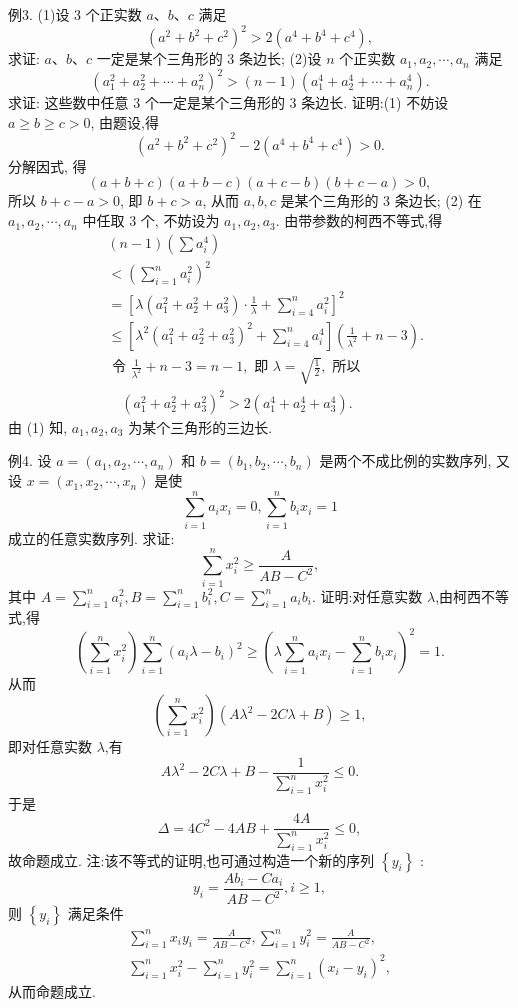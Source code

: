 例3. (1)设 3 个正实数 $a 、 b 、 c$ 满足
$$
\left(a^2+b^2+c^2\right)^2>2\left(a^4+b^4+c^4\right),
$$
求证: $a 、 b 、 c$ 一定是某个三角形的 3 条边长;
(2)设 $n$ 个正实数 $a_1, a_2, \cdots, a_n$ 满足
$$
\left(a_1^2+a_2^2+\cdots+a_n^2\right)^2>(n-1)\left(a_1^4+a_2^4+\cdots+a_n^4\right) .
$$
求证: 这些数中任意 3 个一定是某个三角形的 3 条边长.
证明:(1) 不妨设 $a \geqslant b \geqslant c>0$, 由题设,得
$$
\left(a^2+b^2+c^2\right)^2-2\left(a^4+b^4+c^4\right)>0 .
$$
分解因式, 得
$$
(a+b+c)(a+b-c)(a+c-b)(b+c-a)>0,
$$
所以 $b+c-a>0$, 即 $b+c>a$, 从而 $a, b, c$ 是某个三角形的 3 条边长;
(2) 在 $a_1, a_2, \cdots, a_n$ 中任取 3 个, 不妨设为 $a_1, a_2, a_3$. 由带参数的柯西不等式,得
$$
\begin{aligned}
&(n-1)\left(\sum a_i^4\right) \\
&<\left(\sum_{i=1}^n a_i^2\right)^2 \\
&= {\left[\lambda\left(a_1^2+a_2^2+a_3^2\right) \cdot \frac{1}{\lambda}+\sum_{i=4}^n a_i^2\right]^2 } \\
& \leqslant {\left[\lambda^2\left(a_1^2+a_2^2+a_3^2\right)^2+\sum_{i=4}^n a_i^4\right]\left(\frac{1}{\lambda^2}+n-3\right) . } \\
& \text { 令 } \frac{1}{\lambda^2}+n-3=n-1, \text { 即 } \lambda=\sqrt{\frac{1}{2}}, \text { 所以 } \\
& \quad\left(a_1^2+a_2^2+a_3^2\right)^2>2\left(a_1^4+a_2^4+a_3^4\right) .
\end{aligned}
$$
由 (1) 知, $a_1, a_2, a_3$ 为某个三角形的三边长.



例4. 设 $a=\left(a_1, a_2, \cdots, a_n\right)$ 和 $b=\left(b_1, b_2, \cdots, b_n\right)$ 是两个不成比例的实数序列, 又设 $x=\left(x_1, x_2, \cdots, x_n\right)$ 是使
$$
\sum_{i=1}^n a_i x_i=0, \sum_{i=1}^n b_i x_i=1
$$
成立的任意实数序列.
求证:
$$
\sum_{i=1}^n x_i^2 \geqslant \frac{A}{A B-C^2},
$$
其中 $A=\sum_{i=1}^n a_i^2, B=\sum_{i=1}^n b_i^2, C=\sum_{i=1}^n a_i b_i$.
证明:对任意实数 $\lambda$,由柯西不等式,得
$$
\left(\sum_{i=1}^n x_i^2\right) \sum_{i=1}^n\left(a_i \lambda-b_i\right)^2 \geqslant\left(\lambda \sum_{i=1}^n a_i x_i-\sum_{i=1}^n b_i x_i\right)^2=1 .
$$
从而
$$
\left(\sum_{i=1}^n x_i^2\right)\left(A \lambda^2-2 C \lambda+B\right) \geqslant 1,
$$
即对任意实数 $\lambda$,有
$$
A \lambda^2-2 C \lambda+B-\frac{1}{\sum_{i=1}^n x_i^2} \leqslant 0 .
$$
于是
$$
\Delta=4 C^2-4 A B+\frac{4 A}{\sum_{i=1}^n x_i^2} \leqslant 0,
$$
故命题成立.
注:该不等式的证明,也可通过构造一个新的序列 $\left\{y_i\right\}$ :
$$
y_i=\frac{A b_i-C a_i}{A B-C^2}, i \geqslant 1,
$$
则 $\left\{y_i\right\}$ 满足条件
$$
\begin{gathered}
\sum_{i=1}^n x_i y_i=\frac{A}{A B-C^2}, \sum_{i=1}^n y_i^2=\frac{A}{A B-C^2}, \\
\sum_{i=1}^n x_i^2-\sum_{i=1}^n y_i^2=\sum_{i=1}^n\left(x_i-y_i\right)^2,
\end{gathered}
$$
从而命题成立.


